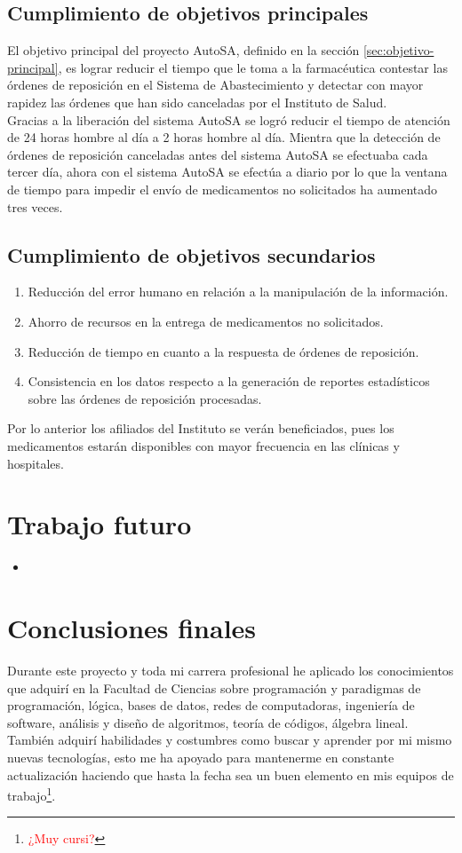 \subsection{Cumplimiento de objetivos principales}
El objetivo principal del proyecto AutoSA, definido en la sección \ref{sec:objetivo-principal}, es lograr reducir el tiempo que le toma a la farmacéutica contestar las órdenes de reposición en el Sistema de Abastecimiento y detectar con mayor rapidez las órdenes que han sido canceladas por el Instituto de Salud.\\
Gracias a la liberación del sistema AutoSA se logró reducir el tiempo de atención de 24 horas hombre al día a 2 horas hombre al día. Mientra que la detección de órdenes de reposición canceladas antes del sistema AutoSA se efectuaba cada tercer día, ahora con el sistema AutoSA se efectúa a diario por lo que la ventana de tiempo para impedir el envío de medicamentos no solicitados ha aumentado tres veces.

\subsection{Cumplimiento de objetivos secundarios}

\begin{enumerate}
	\item Reducción del error humano en relación a la manipulación de la información.
	\item Ahorro de recursos en la entrega de medicamentos no solicitados.
	\item Reducción de tiempo en cuanto a la respuesta de órdenes de reposición.
	\item Consistencia en los datos respecto a la generación de reportes estadísticos sobre las órdenes de reposición procesadas.
\end{enumerate}
Por lo anterior los afiliados del Instituto se verán beneficiados, pues los medicamentos estarán disponibles con mayor frecuencia en las clínicas y hospitales.

\section{Trabajo futuro}
\begin{itemize}
	\item 
\end{itemize}

\section{Conclusiones finales}

Durante este proyecto y toda mi carrera profesional he aplicado los conocimientos que adquirí en la Facultad de Ciencias sobre programación y paradigmas de programación, lógica, bases de datos, redes de computadoras, ingeniería de software, análisis y diseño de algoritmos, teoría de códigos, álgebra lineal. También adquirí habilidades y costumbres como buscar y aprender por mi mismo nuevas tecnologías, esto me ha apoyado para mantenerme en constante actualización haciendo que hasta la fecha sea un buen elemento en mis equipos de trabajo\footnote{\textcolor{red}{¿Muy cursi?}}.
